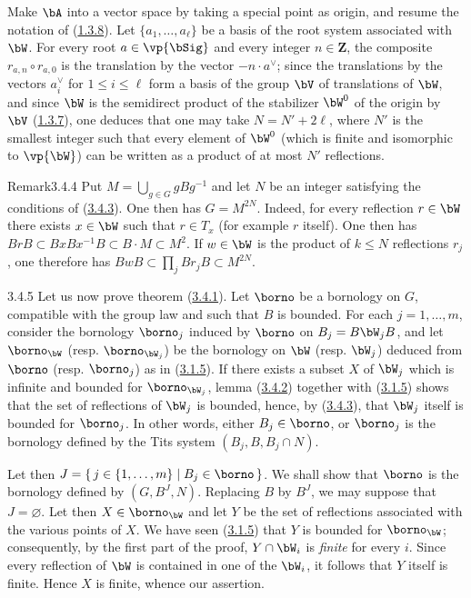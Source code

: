 \documentclass[12pt,a4paper,oneside,english]{smfart}
\makeatletter
\newcommand{\btanchor}[1]{\leavevmode\Hy@raisedlink{\hypertarget{bt:#1}{}}}
\newcommand{\btref}[1]{\hyperlink{bt:#1}{#1}}
\theoremstyle{definition}
\theoremstyle{bt}
\makeatother
\begin{document}
Make $\bA$ into a vector space by taking a special point as origin, and
resume the notation of (\btref{1.3.8}). Let $\{a_1,\dots,a_\ell\}$ be a basis of the
root system associated with $\bW$. For every root $a \in \vp{\bSig}$ and
every integer $n \in \mathbf{Z}$, the composite $r_{a,n}\circ r_{a,0}$ is the
translation by the vector $-n\cdot a^{\vee}$; since the translations by the
vectors $a_i^{\vee}$ for $1\leqslant i\leqslant \ell$ form a basis of the
group $\bV$ of translations of $\bW$, and since $\bW$ is the semidirect
product of the stabilizer $\bW^{0}$ of the origin by $\bV$ (\btref{1.3.7}), one
deduces that one may take $N = N' + 2\ell$, where $N'$ is the smallest
integer such that every element of $\bW^{0}$ (which is finite and isomorphic
to $\vp{\bW}$) can be written as a product of at most $N'$ reflections.

\begin{state}{Remark}{3.4.4}\btanchor{3.4.4}
\upshape
Put $M = \bigcup_{g\in G} gBg^{-1}$ and let $N$ be an integer satisfying the
conditions of (\btref{3.4.3}). One then has $G = M^{2N}$. Indeed, for every
reflection $r \in \bW$ there exists $x \in \bW$ such that $r \in T_x$ (for
example $r$ itself). One then has
$BrB \subset BxBx^{-1}B \subset B\cdot M \subset M^{2}$. If $w \in \bW$ is
the product of $k \leqslant N$ reflections $r_j$, one therefore has
$BwB \subset \prod_j Br_jB \subset M^{2N}$.
\end{state}

\num{3.4.5}\btanchor{3.4.5}
Let us now prove theorem (\btref{3.4.1}). Let $\borno$ be a bornology on $G$,
compatible with the group law and such that $B$ is bounded. For each
$j = 1,\dots,m$, consider the bornology $\borno_j$ induced by $\borno$ on
$B_j = B\bW_j B$, and let $\borno_{\bW}$ (resp. $\borno_{\bW_j}$) be the
bornology on $\bW$ (resp. $\bW_j$) deduced from $\borno$ (resp. $\borno_j$)
as in (\btref{3.1.5}). If there exists a subset $X$ of $\bW_j$ which is infinite and
bounded for $\borno_{\bW_j}$, lemma (\btref{3.4.2}) together with (\btref{3.1.5}) shows that
the set of reflections of $\bW_j$ is bounded, hence, by (\btref{3.4.3}), that
$\bW_j$ itself is bounded for $\borno_j$. In other words, either
$B_j \in \borno$, or $\borno_j$ is the bornology defined by the Tits system
$(B_j, B, B_j\cap N)$.

Let then $J = \{\,j \in \{1,\dots,m\} \mid B_j \in \borno\,\}$. We shall show
that $\borno$ is the bornology defined by $(G, B^{J}, N)$. Replacing $B$ by
$B^{J}$, we may suppose that $J = \varnothing$. Let then
$X \in \borno_{\bW}$ and let $Y$ be the set of reflections associated with
the various points of $X$. We have seen (\btref{3.1.5}) that $Y$ is bounded for
$\borno_{\bW}$; consequently, by the first part of the proof, $Y \cap \bW_i$
is \emph{finite} for every $i$. Since every reflection of $\bW$ is contained
in one of the $\bW_i$, it follows that $Y$ itself is finite. Hence $X$ is
finite, whence our assertion.
\end{document}
